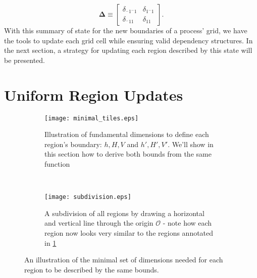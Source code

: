 \begin{equation}
  \mathbf{\Delta} \equiv \begin{bmatrix}
    \delta_{^-1^-1} & \delta_{1^-1} \\
    \delta_{^-11} & \delta_{11}
    \end{bmatrix}.
    \label{eq:D}
\end{equation}
With this summary of state for the new boundaries of a process'
 grid, we have the tools to update each grid cell while
 ensuring valid dependency structures.
In the next section, a strategy for updating each region described
by this state will be presented.

\section{Uniform Region Updates}

\begin{figure}[ht]
  \centering
  \begin{subfigure}[ht]{.5\textwidth}
    \centering
    \texttt{[image: minimal\_tiles.eps]}
    \caption{Illustration of fundamental dimensions to define each region's boundary: $h,H,V$ and
    $h',H',V'$.  We'll show in this section how to derive both bounds from the same function}\label{subfig:mintile}
  \end{subfigure}
  ~
  \begin{subfigure}[ht]{.4\textwidth}
    \centering
    \texttt{[image: subdivision.eps]}
    \caption{A subdivision of all regions by drawing a horizontal and vertical line through the origin
    $\mathcal{O}$ - note how each region now looks very similar to the regions annotated in \ref{subfig:mintile}}
    \label{subfig:subdivision}
    \end{subfigure}
  \caption{An illustration of the minimal set of dimensions needed for each region to be described by the same
  bounds.}
  \label{fig:tiles}
\end{figure}

